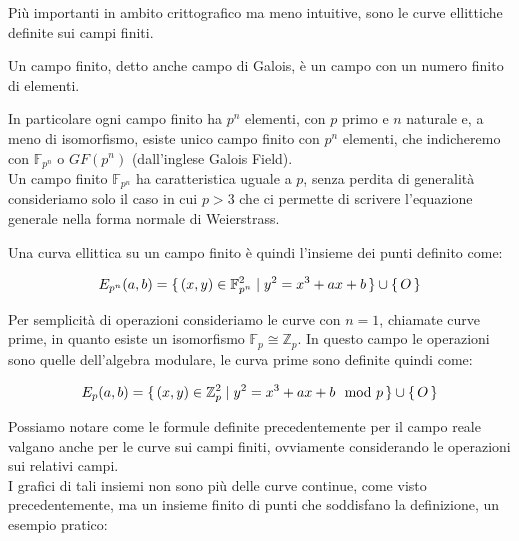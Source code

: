 \documentclass{article}
\begin{document}
	Più importanti in ambito crittografico ma meno intuitive, sono le curve ellittiche definite sui campi finiti.
	
	\begin{defn}
		Un campo finito, detto anche campo di Galois, è un campo con un numero finito di elementi.
	\end{defn}
	
	In particolare ogni campo finito ha $p^{n}$ elementi, con $p$ primo e $n$ naturale e, a meno di isomorfismo,
	esiste unico campo finito con $p^{n}$ elementi, che indicheremo con $\mathbb{F}_{p^{n}}$ o $GF(p^{n})$ (dall'inglese Galois Field). \\
	
	Un campo finito $\mathbb{F}_{p^{n}}$ ha caratteristica uguale a $p$, 
	senza perdita di generalità consideriamo solo il caso in cui $p > 3$ che ci permette di scrivere l'equazione
	generale nella forma normale di Weierstrass. \\
	
	\clearpage
	
	Una curva ellittica su un campo finito è quindi l'insieme dei punti definito come:
	
	\begin{equation}
	E_{p^{n}}(a,b) = \set{ (x,y) \in \mathbb{F}_{p^{n}}^{2} | y^{2} = x^{3} + ax + b } \cup \set{O}
	\end{equation}
	
	Per semplicità di operazioni consideriamo le curve con $n=1$, chiamate curve prime, in quanto esiste un isomorfismo $\mathbb{F}_{p} \cong \mathbb{Z}_{p}$.
	In questo campo le operazioni sono quelle dell'algebra modulare, 
	le curva prime sono definite quindi come:
	
	\begin{equation}
	E_{p}(a,b) = \set{ (x,y) \in \mathbb{Z}_{p}^{2} | y^{2} = x^{3} + ax + b \mod p } \cup \set{O}
	\end{equation}
	
	Possiamo notare come le formule definite precedentemente per il campo reale valgano anche 
	per le curve sui campi finiti, ovviamente considerando le operazioni sui relativi campi.\\
	
	I grafici di tali insiemi non sono più delle curve continue, come visto precedentemente,
	ma un insieme finito di punti che soddisfano la definizione, un esempio pratico:
	
\end{document}
